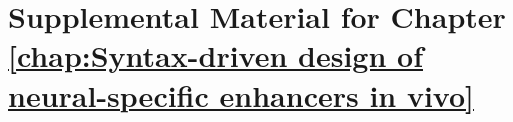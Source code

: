 \appendix{}

\chapter{Supplemental Material for Chapter \ref{chap:Syntax-driven design of neural-specific enhancers in vivo}}